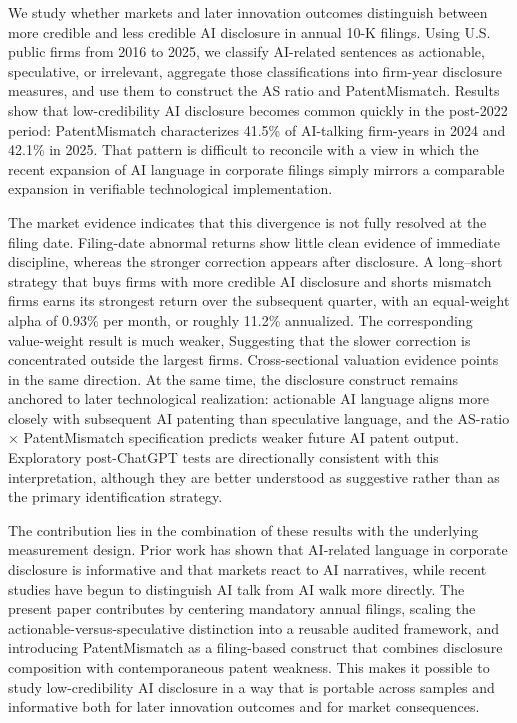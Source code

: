 We study whether markets and later innovation outcomes distinguish between more credible and less credible AI disclosure in annual 10-K filings. Using U.S. public firms from 2016 to 2025, we classify AI-related sentences as actionable, speculative, or irrelevant, aggregate those classifications into firm-year disclosure measures, and use them to construct the AS ratio and PatentMismatch. Results show that low-credibility AI disclosure becomes common quickly in the post-2022 period: PatentMismatch characterizes 41.5\% of AI-talking firm-years in 2024 and 42.1\% in 2025. That pattern is difficult to reconcile with a view in which the recent expansion of AI language in corporate filings simply mirrors a comparable expansion in verifiable technological implementation.

The market evidence indicates that this divergence is not fully resolved at the filing date. Filing-date abnormal returns show little clean evidence of immediate discipline, whereas the stronger correction appears after disclosure. A long--short strategy that buys firms with more credible AI disclosure and shorts mismatch firms earns its strongest return over the subsequent quarter, with an equal-weight alpha of 0.93\% per month, or roughly 11.2\% annualized. The corresponding value-weight result is much weaker, Suggesting that the slower correction is concentrated outside the largest firms. Cross-sectional valuation evidence points in the same direction. At the same time, the disclosure construct remains anchored to later technological realization: actionable AI language aligns more closely with subsequent AI patenting than speculative language, and the AS-ratio $\times$ PatentMismatch specification predicts weaker future AI patent output. Exploratory post-ChatGPT tests are directionally consistent with this interpretation, although they are better understood as suggestive rather than as the primary identification strategy.

The contribution lies in the combination of these results with the underlying measurement design. Prior work has shown that AI-related language in corporate disclosure is informative and that markets react to AI narratives, while recent studies have begun to distinguish AI talk from AI walk more directly. The present paper contributes by centering mandatory annual filings, scaling the actionable-versus-speculative distinction into a reusable audited framework, and introducing PatentMismatch as a filing-based construct that combines disclosure composition with contemporaneous patent weakness. This makes it possible to study low-credibility AI disclosure in a way that is portable across samples and informative both for later innovation outcomes and for market consequences.

